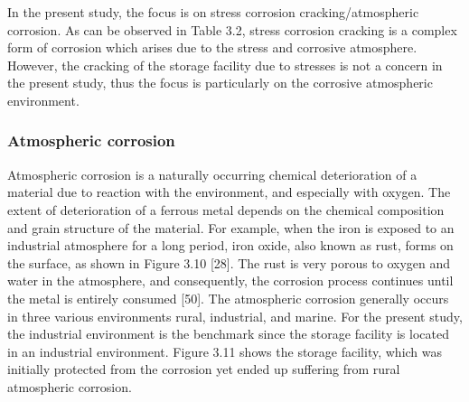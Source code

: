 \documentclass[12pt]{report}
\begin{document}
In the present study, the focus is on stress corrosion cracking/atmospheric corrosion. As can be observed in Table 3.2, stress corrosion cracking is a complex form of corrosion which arises due to the stress and corrosive atmosphere. However, the cracking of the storage facility due to stresses is not a concern in the present study, thus the focus is particularly on the corrosive atmospheric environment.

\subsubsection{Atmospheric corrosion}
Atmospheric corrosion is a naturally occurring chemical deterioration of a material due to reaction with the environment, and especially with oxygen. The extent of deterioration of a ferrous metal depends on the chemical composition and grain structure of the material. For example, when the iron is exposed to an industrial atmosphere for a long period, iron oxide, also known as rust, forms on the surface, as shown in Figure 3.10 [28]. The rust is very porous to oxygen and water in the atmosphere, and consequently, the corrosion process continues until the metal is entirely consumed [50].  The atmospheric corrosion generally occurs in three various environments rural, industrial, and marine. For the present study, the industrial environment is the benchmark since the storage facility is located in an industrial environment. Figure 3.11 shows the storage facility, which was initially protected from the corrosion yet ended up suffering from rural atmospheric corrosion.

 
\end{document}

